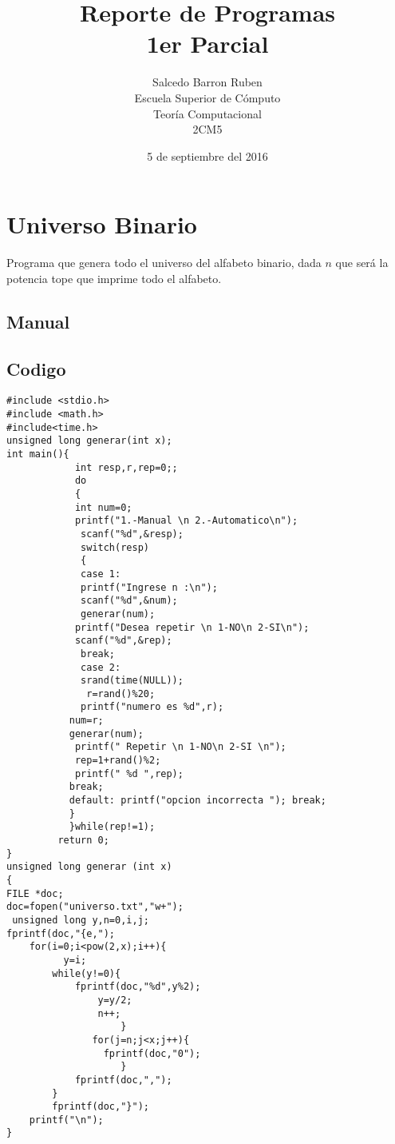 \documentclass[12pt]{article}
\title{Reporte de  Programas\\1er Parcial}
\author{Salcedo Barron Ruben\\
		Escuela Superior de C\'omputo\\
		Teor\'ia Computacional\\ 
		2CM5
		}
\date{5 de septiembre del 2016}
\begin{document}
\maketitle
\tableofcontents
\newpage 
\section{Universo Binario}

Programa que genera todo el universo del alfabeto binario, dada $n$ que ser\'a la potencia tope que imprime todo el alfabeto.
\subsection{Manual}

\subsection{Codigo}
\lstset{language=C, breaklines=true, basicstyle=\footnotesize}
\begin{lstlisting}[frame=single]
#include <stdio.h>
#include <math.h>
#include<time.h> 
unsigned long generar(int x);
int main(){
            int resp,r,rep=0;;
			do
			{
			int num=0;
			printf("1.-Manual \n 2.-Automatico\n");
             scanf("%d",&resp);
			 switch(resp)
			 {
             case 1: 
             printf("Ingrese n :\n");
             scanf("%d",&num);
             generar(num);
		    printf("Desea repetir \n 1-NO\n 2-SI\n");
			scanf("%d",&rep);
			 break;
			 case 2: 
             srand(time(NULL));
			  r=rand()%20;
			 printf("numero es %d",r);
           num=r;
		   generar(num);
		    printf(" Repetir \n 1-NO\n 2-SI \n");
			rep=1+rand()%2;
			printf(" %d ",rep);
		   break;
		   default: printf("opcion incorrecta "); break;
		   }
		   }while(rep!=1);
		 return 0;
} 
unsigned long generar (int x)
{
FILE *doc;
doc=fopen("universo.txt","w+");
 unsigned long y,n=0,i,j;
fprintf(doc,"{e,"); 
    for(i=0;i<pow(2,x);i++){
          y=i;  
		while(y!=0){
            fprintf(doc,"%d",y%2);
                y=y/2;
                n++;
					}
               for(j=n;j<x;j++){
                 fprintf(doc,"0");
					}           
			fprintf(doc,",");
		}
		fprintf(doc,"}");
	printf("\n");
}
\end{lstlisting}
\end{document}

